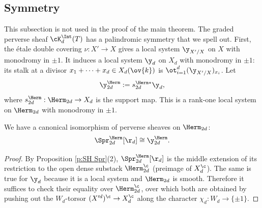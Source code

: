 



\subsection{Symmetry} This subsection is not used in the proof of the main theorem. The graded perverse sheaf $\cK^{\Int}_{d}(T)$ has a palindromic symmetry that we spell out. First, the \'etale double covering $\nu:X'\to X$ gives a local system $\y_{X'/X}$ on $X$ with monodromy in $\pm1$.  It induces a local system $\y_{d}$ on $X_{d}$ with monodromy in $\pm1$: its stalk at a divisor $x_{1}+\cdots+x_{d}\in X_{d}(\ov{k})$ is $\ot_{i=1}^{d}(\y_{X'/X})_{x_{i}}$. Let
\begin{equation}
\y^{\Herm}_{2d}:=s^{\Herm*}_{2d}\y_{d},
\end{equation}
where $s^{\Herm}_{2d}: \Herm_{2d}\to X_{d}$ is the support map. This is a rank-one local system on $\Herm_{2d}$ with monodromy in $\pm1$.

\begin{lemma}
\notready We have a canonical isomorphism of perverse sheaves on $\Herm_{2d}$:
\begin{equation}
\Spr^{\Herm}_{2d}[\r_{d}]\cong\y^{\Herm}_{2d}.
\end{equation}
\end{lemma}
\begin{proof}
By Proposition \ref{p:SH Spr}(2), $\Spr^{\Herm}_{2d}[\r_{d}]$ is the middle extension of its restriction to the open dense substack $\Herm_{2d}^{\c}$ (preimage of $X^{\c}_{d}$). The same is true for $\y_{d}$  because it is a local system and $\Herm_{2d}$ is smooth. Therefore it suffices to check their equality over $\Herm_{2d}^{\c}$, over which both are obtained by pushing out the $W_{d}$-torsor $(X'^{d})^{\c}\to X_{d}^{\c}$ along the character $\chi_{d}: W_{d}\to \{\pm1\}$.
\end{proof}


